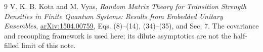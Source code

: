 \documentclass[11pt,a4paper]{article}
\begin{document}
\begin{thebibliography}{9}
 V. K. B. Kota and M. Vyas,
\emph{Random Matrix Theory for Transition Strength Densities in
Finite Quantum Systems: Results from Embedded Unitary Ensembles},
\href{https://arxiv.org/abs/1504.00759}{arXiv:1504.00759},
Eqs. (8)--(14), (34)--(35), and Sec. 7.
The covariance and recoupling framework is used here; its dilute
asymptotics are not the half-filled limit of this note.
\end{thebibliography}
\end{document}
